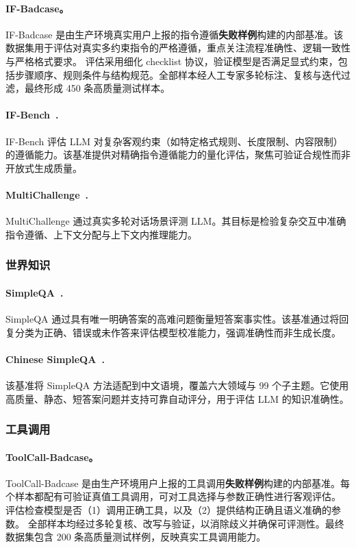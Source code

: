 \paragraph{IF-Badcase。} IF-Badcase 是由生产环境真实用户上报的指令遵循\textbf{失败样例}构建的内部基准。该数据集用于评估对真实多约束指令的严格遵循，重点关注流程准确性、逻辑一致性与严格格式要求。
评估采用细化 checklist 协议，验证模型是否满足显式约束，包括步骤顺序、规则条件与结构规范。全部样本经人工专家多轮标注、复核与迭代过滤，最终形成 450 条高质量测试样本。

\paragraph{IF-Bench~\citep{ifbench}.} IF-Bench 评估 LLM 对复杂客观约束（如特定格式规则、长度限制、内容限制）的遵循能力。该基准提供对精确指令遵循能力的量化评估，聚焦可验证合规性而非开放式生成质量。

\paragraph{MultiChallenge~\citep{multichallenge}.} MultiChallenge 通过真实多轮对话场景评测 LLM。其目标是检验复杂交互中准确指令遵循、上下文分配与上下文内推理能力。


\subsubsection{世界知识}

\paragraph{SimpleQA~\citep{simpleQA}.} SimpleQA 通过具有唯一明确答案的高难问题衡量短答案事实性。该基准通过将回复分类为正确、错误或未作答来评估模型校准能力，强调准确性而非生成长度。

\paragraph{Chinese SimpleQA~\citep{chinesesimpleQA}.} 该基准将 SimpleQA 方法适配到中文语境，覆盖六大领域与 99 个子主题。它使用高质量、静态、短答案问题并支持可靠自动评分，用于评估 LLM 的知识准确性。

\subsubsection{工具调用}
\paragraph{ToolCall-Badcase。} ToolCall-Badcase 是由生产环境用户上报的工具调用\textbf{失败样例}构建的内部基准。每个样本都配有可验证真值工具调用，可对工具选择与参数正确性进行客观评估。
评估检查模型是否（1）调用正确工具，以及（2）提供结构正确且语义准确的参数。
全部样本均经过多轮复核、改写与验证，以消除歧义并确保可评测性。最终数据集包含 200 条高质量测试样例，反映真实工具调用能力。

